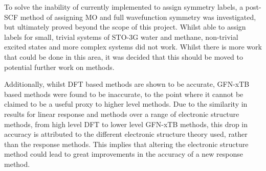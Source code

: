 To solve the inability of currently implemented \dscf to assign symmetry labels,
a post-SCF method of assigning MO and full wavefunction symmetry was investigated,
but ultimately proved beyond the scope of this project. Whilst able to assign labels
for small, trivial systems of STO-3G water and methane, non-trivial excited states
and more complex systems did not work. Whilst there is more work that could be done
in this area, it was decided that this should be moved to potential further work
on \dscf methods.

Additionally, whilst DFT based \dscf methods are shown to be accurate, GFN-xTB based methods
were found to be inaccurate, to the point where it cannot be claimed to be a useful
proxy to higher level methods. Due to the similarity in results for linear response and
\dscf methods over a range of electronic structure methods, from high level DFT
to lower level GFN-xTB methods, this drop in accuracy is attributed to the different 
electronic structure theory used, rather than the response methods. This implies
that altering the electronic structure method could lead to great improvements
in the accuracy of a new response method.
